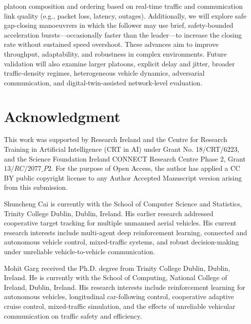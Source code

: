 \documentclass{ieeeaccess}
\begin{document}
platoon composition and ordering based on real-time traffic and communication link quality (e.g., packet loss, latency, outages). Additionally, we will explore safe gap-closing manoeuvrers in which the follower may use brief, safety-bounded acceleration bursts—occasionally faster than the leader—to increase the closing rate without sustained speed overshoot. These advances aim to improve throughput, adaptability, and robustness in complex environments. Future validation will also examine larger platoons, explicit delay and jitter, broader traffic-density regimes, heterogeneous vehicle dynamics, adversarial communication, and digital-twin-assisted network-level evaluation. %

\section*{Acknowledgment}
This work was supported by Research Ireland and the Centre for Research Training in Artificial Intelligence (CRT in AI) under Grant No. 18/CRT/6223, and the Science Foundation Ireland CONNECT Research Centre Phase 2, Grant $13/RC/2077\_P2$. For the purpose of Open Access, the author has applied a CC BY public copyright license to any Author Accepted Manuscript version arising from this submission.






\begin{IEEEbiographynophoto}{Shuncheng Cai}
is currently with the School of Computer Science and Statistics, Trinity
College Dublin, Dublin, Ireland. His earlier research addressed cooperative
target tracking for multiple unmanned aerial vehicles. His current research
interests include multi-agent deep reinforcement learning, connected and
autonomous vehicle control, mixed-traffic systems, and robust decision-making
under unreliable vehicle-to-vehicle communication.
\end{IEEEbiographynophoto}


\begin{IEEEbiographynophoto}{Mohit Garg}
received the Ph.D. degree from Trinity College Dublin, Dublin, Ireland. He is
currently with the School of Computing, National College of Ireland, Dublin,
Ireland. His research interests include reinforcement learning for autonomous
vehicles, longitudinal car-following control, cooperative adaptive cruise
control, mixed-traffic simulation, and the effects of unreliable vehicular
communication on traffic safety and efficiency.
\end{IEEEbiographynophoto}
\end{document}
